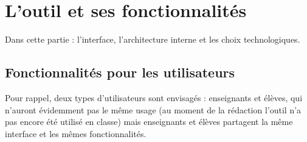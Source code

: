 \documentclass[11pt,a4paper]{article}
\begin{document}
\clearpage
\section{L'outil et ses fonctionnalités}
Dans cette partie : l'interface, l'architecture interne et les choix technologiques. \\

\subsection{Fonctionnalités pour les utilisateurs}
Pour rappel, deux types d'utilisateurs sont envisagés : enseignants et élèves, qui n'auront évidemment pas le même usage (au moment de la rédaction l'outil n'a pas encore été utilisé en classe) mais enseignants et élèves partagent la même interface et les mêmes fonctionnalités.
\end{document}
